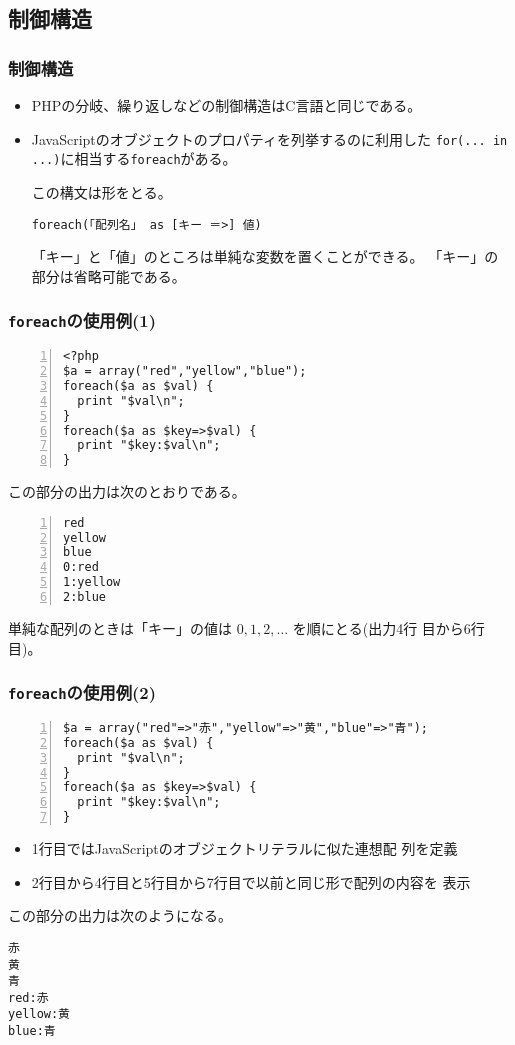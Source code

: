 \subsection{制御構造}
\begin{frame}[containsverbatim]
\frametitle{制御構造}
\begin{itemize}
 \item PHPの分岐、繰り返しなどの制御構造はC言語と同じである。
 \item JavaScriptのオブジェクトのプロパティを列挙するのに利用した
\texttt{for(... in ...)}に相当する\texttt{foreach}がある。

この構文は形をとる。

\texttt{foreach(「配列名」 as [キー ＝>] 値)}

「キー」と「値」のところは単純な変数を置くことができる。
「キー」の部分は省略可能である。
\end{itemize}
\end{frame}
\begin{frame}[containsverbatim]
\frametitle{\texttt{foreach}の使用例(1)}
\begin{Verbatim}[fontsize=\small,numbers=left]
 <?php
$a = array("red","yellow","blue");
foreach($a as $val) {
  print "$val\n";
}
foreach($a as $key=>$val) {
  print "$key:$val\n";
}
\end{Verbatim}

この部分の出力は次のとおりである。
\begin{Verbatim}[fontsize=\small,numbers=left]
red
yellow
blue
0:red
1:yellow
2:blue
\end{Verbatim}

単純な配列のときは「キー」の値は $0,1,2,\dots$ を順にとる(出力4行
       目から6行目)。
\end{frame}
\begin{frame}[containsverbatim]
\frametitle{\texttt{foreach}の使用例(2)}
\begin{Verbatim}[fontsize=\small,numbers=left]
$a = array("red"=>"赤","yellow"=>"黄","blue"=>"青");
foreach($a as $val) {
  print "$val\n";
}
foreach($a as $key=>$val) {
  print "$key:$val\n";
}
\end{Verbatim}
\begin{itemize}
 \item 1行目ではJavaScriptのオブジェクトリテラルに似た連想配
       列を定義
 \item 2行目から4行目と5行目から7行目で以前と同じ形で配列の内容を
       表示
\end{itemize}
この部分の出力は次のようになる。
{\scriptsize
\begin{verbatim}
赤
黄
青
red:赤
yellow:黄
blue:青
\end{verbatim}
}
\end{frame}

